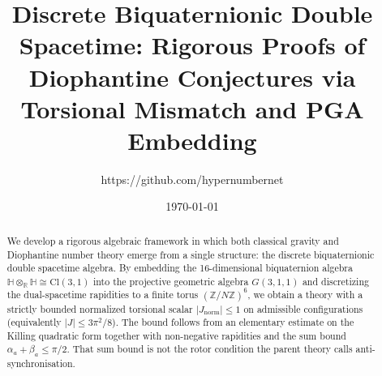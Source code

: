 \documentclass[a4paper]{article}
\title{Discrete Biquaternionic Double Spacetime: Rigorous Proofs of Diophantine Conjectures via Torsional Mismatch and PGA Embedding}
\author{https://github.com/hypernumbernet}
\date{\today}
\theoremstyle{definition}
\theoremstyle{remark}
\newcommand{\Jnorm}{J_{\mathrm{norm}}}
\begin{document}
\maketitle

\begin{abstract}
We develop a rigorous algebraic framework in which both classical gravity and Diophantine number theory emerge from a single structure: the discrete biquaternionic double spacetime algebra. By embedding the 16-dimensional biquaternion algebra \(\mathbb{H} \otimes_{\mathbb{R}} \mathbb{H} \cong \mathrm{Cl}(3,1)\) into the projective geometric algebra \(G(3,1,1)\) and discretizing the dual-spacetime rapidities to a finite torus \((\mathbb{Z}/N\mathbb{Z})^6\), we obtain a theory with a strictly bounded normalized torsional scalar \(|\Jnorm| \leq 1\) on admissible configurations (equivalently \(|J| \leq 3\pi^2/8\)). The bound follows from an elementary estimate on the Killing quadratic form together with non-negative rapidities and the sum bound \(\alpha_a+\beta_a\le\pi/2\). That sum bound is not the rotor condition the parent theory calls anti-synchronisation.


\end{abstract}
\end{document}

